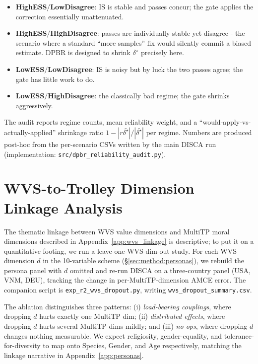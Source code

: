 \documentclass{article}
\begin{document}
\begin{itemize}
\item \textbf{HighESS$/$LowDisagree}: IS is stable and passes concur; the
      gate applies the correction essentially unattenuated.
\item \textbf{HighESS$/$HighDisagree}: passes are individually stable
      yet disagree - the scenario where a standard ``more samples'' fix
      would silently commit a biased estimate. DPBR is designed to shrink
      $\delta^\star$ precisely here.
\item \textbf{LowESS$/$LowDisagree}: IS is noisy but by luck the two
      passes agree; the gate has little work to do.
\item \textbf{LowESS$/$HighDisagree}: the classically bad regime; the
      gate shrinks aggressively.
\end{itemize}

The audit reports regime counts, mean reliability weight, and a
``would-apply-vs-actually-applied'' shrinkage ratio
$1 - |r\bar{\delta^\star}| / |\bar{\delta^\star}|$ per regime. Numbers are
produced post-hoc from the per-scenario CSVs written by the main DISCA
run (implementation: \texttt{src/dpbr\_reliability\_audit.py}).

\section{WVS-to-Trolley Dimension Linkage Analysis}
\label{app:r2_wvs_dropout}

The thematic linkage between WVS value dimensions and MultiTP moral
dimensions described in Appendix~\ref{app:wvs_linkage} is descriptive;
to put it on a quantitative footing, we run a leave-one-WVS-dim-out
study. For each WVS dimension $d$ in the 10-variable scheme
(\S\ref{sec:method:personas}), we rebuild the persona panel with $d$
omitted and re-run DISCA on a three-country panel (USA, VNM, DEU),
tracking the change in per-MultiTP-dimension AMCE error. The companion
script is \texttt{exp\_r2\_wvs\_dropout.py}, writing
\texttt{wvs\_dropout\_summary.csv}.

The ablation distinguishes three patterns: (i) \emph{load-bearing
couplings}, where dropping $d$ hurts exactly one MultiTP dim; (ii)
\emph{distributed effects}, where dropping $d$ hurts several MultiTP
dims mildly; and (iii) \emph{no-ops}, where dropping $d$ changes
nothing measurable. We expect religiosity, gender-equality, and
tolerance-for-diversity to map onto Species, Gender, and Age
respectively, matching the linkage narrative in
Appendix~\ref{app:personas}.
\end{document}
